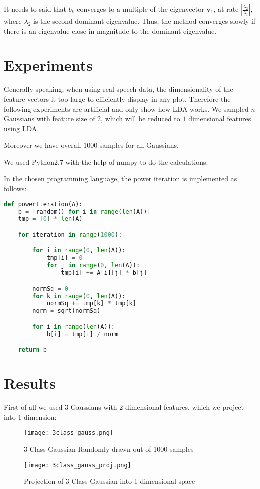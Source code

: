 It needs to said that $b_k$ converges to a multiple of the eigenvector $\mathbf{v}_1$, at rate $ \left| \frac{\lambda_2}{\lambda_1} \right| $, where $\lambda_2$ is the second dominant eigenvalue. Thus, the method converges slowly if there is an eigenvalue close in magnitude to the dominant eigenvalue.

\section{Experiments}

Generally speaking, when using real speech data, the dimensionality of the feature vectors it too large to efficiently display in any plot.
Therefore the following experiments are artificial and only show how LDA works. We sampled $n$ Gaussians with feature size of $2$, which will be reduced to $1$ dimensional features using LDA.

Moreover we have overall $1000$ samples for all Gaussians.

We used Python2.7 with the help of numpy to do the calculations.

In the chosen programming language, the power iteration is implemented as follows:
\begin{lstlisting}[language=python]
def powerIteration(A):
    b = [random() for i in range(len(A))]
    tmp = [0] * len(A)

    for iteration in range(1000):

        for i in range(0, len(A)):
            tmp[i] = 0
            for j in range(0, len(A)):
                tmp[i] += A[i][j] * b[j]

        normSq = 0
        for k in range(0, len(A)):
            normSq += tmp[k] * tmp[k]
        norm = sqrt(normSq)

        for i in range(len(A)):
            b[i] = tmp[i] / norm

    return b
\end{lstlisting}

\section{Results}

First of all we used 3 Gaussians with 2 dimensional features, which we project into 1 dimension:

\begin{figure}
\centering
\texttt{[image: 3class\_gauss.png]}
\caption{3 Class Gaussian Randomly drawn out of 1000 samples}
\end{figure}

\begin{figure}
\texttt{[image: 3class\_gauss\_proj.png]}
\centering
\caption{Projection of 3 Class Gaussian into 1 dimensional space}
\end{figure}
